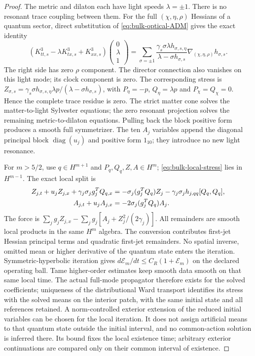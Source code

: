\begin{proof}
The metric and dilaton each have light speeds $\lambda=\pm1$.
There is no resonant trace coupling between them. For the full
$(\chi,\eta,\rho)$ Hessians of a quantum sector, direct substitution
of \eqref{eq:bulk-optical-ADM} gives the exact identity
\begin{equation}
 (K^3_{tt,s}-\lambda K^3_{tx,s}+K^3_{xx,s})
       \begin{pmatrix}0\\\lambda\\1\end{pmatrix}
 =\sum_{\sigma=\pm1}
 \frac{\gamma_s\sigma\lambda h_{\sigma,s,\eta}}
      {\lambda-\sigma h_{\sigma,s}}
       \nabla_{(\chi,\eta,\rho)}h_{\sigma,s}.              \label{eq:bulk-light-residue}
\end{equation}
The right side has zero $\rho$ component. The director connection
also vanishes on this light mode; its clock component is zero.
The corresponding stress is
$Z_{\sigma,s}=\gamma_s\sigma h_{\sigma,s,\eta}\lambda p/
(\lambda-\sigma h_{\sigma,s})$, with
$P_\eta=-p$, $Q_\eta=\lambda p$ and $P_\chi=Q_\chi=0$.
Hence the complete trace residue is zero. The strict matter cone
solves the matter-to-light Sylvester equations; the zero resonant
projection solves the remaining metric-to-dilaton equations.
Pulling back the block positive form produces a smooth full symmetrizer.
The ten $A_j$ variables append the diagonal principal block
$\operatorname{diag}(u_j)$ and positive form $1_{10}$; they introduce
no new light resonance.

For $m>5/2$, use $q\in H^{m+1}$ and $P_q,Q_q,Z,A\in H^m$;
\eqref{eq:bulk-local-stress} lies in $H^{m-1}$. The exact local split is
\begin{align}
 Z_{j,t}+u_jZ_{j,x}+\gamma_j\sigma_jg_j^TQ_{q,x}
 &=-\sigma_j(g_j^TQ_q)Z_j
   -\gamma_j\sigma_jh_{j,qq}[Q_q,Q_q],\notag\\
 A_{j,t}+u_jA_{j,x}&=-2\sigma_j(g_j^TQ_q)A_j.             \label{eq:bulk-local-remainders}
\end{align}
The force is $\sum_jg_jZ_{j,x}
-\sum_jg_j[A_j+Z_j^2/(2\gamma_j)]$. All remainders are smooth
local products in the same $H^m$ algebra. The conversion contributes
first-jet Hessian principal terms and quadratic first-jet remainders.
No spatial inverse, omitted mean or higher derivative of the quantum
state enters the iteration. Symmetric-hyperbolic iteration
gives $d\mathcal E_m/dt\le C_R(1+\mathcal E_m)$ on the declared
operating ball. Tame higher-order estimates keep smooth data smooth
on that same local time. The actual full-mode propagator therefore
exists for the solved coefficients; uniqueness of the distributional
Ward transport identifies its stress with the solved means on the
interior patch, with the same initial state and all references retained.
A norm-controlled exterior extension of the reduced initial variables
can be chosen for the local iteration. It does not assign artificial
means to that quantum state outside the initial interval, and no
common-action solution is inferred there. Its bound fixes the local
existence time; arbitrary exterior continuations are compared only on
their common interval of existence.


\end{proof}
